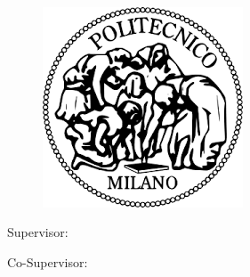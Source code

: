 \begin{titlepage}
    \begin{center}
    	\large
        \spacedlowsmallcaps{\myUni} \\
        \bigskip\myFaculty \\
        \medskip\mySchool \\
    	\medskip\myDepartment \\
    	\bigskip\myCourseFirstPart \\
        \medskip\myCourseSecondPart \\  

        \hfill

        \vfill
        
        \begin{figure}[!h]
			\begin{center}
				\includegraphics[width=0.3\columnwidth]{Images/logo_polimi.png}%
			\end{center}
		\end{figure}
		
		\vfill

        \begingroup
       		\huge	
            \color{Maroon} \myTitle
            \bigskip
        \endgroup

        \vfill

		\flushleft 
		\normalsize{Supervisor:}\\
		\medskip\spacedlowsmallcaps{\mySupervisor}

		\flushleft
		\normalsize{Co-Supervisor:}\\
		\medskip\spacedlowsmallcaps{\myOtherSupervisor}\\
        

\end{center}
\end{titlepage}
